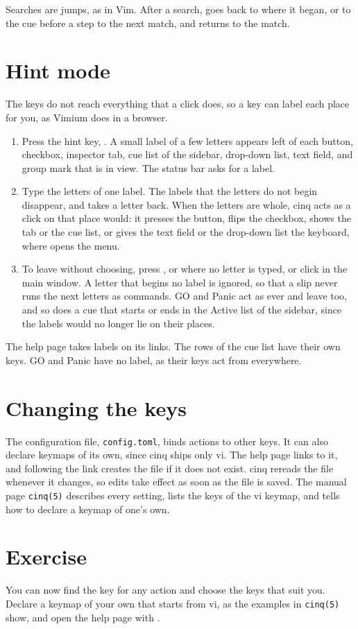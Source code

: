 Searches are jumps, as in Vim.  After a search,  goes back to
where it began, or to the cue before a step to the next match, and
 returns to the match.

\section{Hint mode}

The keys do not reach everything that a click does, so a key can label each
place for you, as Vimium does in a browser.

\begin{enumerate}
\item Press the hint key, .  A small label of a few
  letters appears left of each button, checkbox, inspector tab, cue list of
  the sidebar, drop-down list, text field, and group mark that is in view.
  The status bar asks for a label.
\item Type the letters of one label.  The labels that the letters do not begin
  disappear, and  takes a letter back.  When the letters are
  whole, cinq acts as a click on that place would: it presses the button,
  flips the checkbox, shows the tab or the cue list, or gives the text field or
  the drop-down list the keyboard, where  opens the menu.
\item To leave without choosing, press , or
   where no letter is typed, or click in the main window.  A letter that begins no label is
  ignored, so that a slip never runs the next letters as commands.  GO and
  Panic act as ever and leave too, and so does a cue that starts or ends in the
  Active list of the sidebar, since the labels would no longer lie on their
  places.
\end{enumerate}

The help page takes labels on its links.  The rows of the cue list have their
own keys.  GO and Panic have no label, as their keys act from everywhere.

\section{Changing the keys}

The configuration file, \texttt{config.toml}, binds actions to other keys.  It
can also declare keymaps of its own, since cinq ships only vi.  The help page
links to it, and following the link creates the file if it does not exist.
cinq rereads the file whenever it changes, so edits take effect as soon as the
file is saved.  The manual page \texttt{cinq(5)} describes every setting, lists
the keys of the vi keymap, and tells how to declare a keymap of one's own.

\section*{Exercise}

You can now find the key for any action and choose the keys that suit you.
Declare a keymap of your own that starts from vi, as the examples in
\texttt{cinq(5)} show, and open the help page with .
